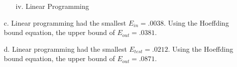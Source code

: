 \documentclass{homework}
\begin{document}
\begin{itemize}
\begin{itemize}
        \item[iv.] Linear Programming
        \begin{figure}[H]
            \centering
            \qquad
        \end{figure}
    \end{itemize}
    
    \item[c.] Linear programming had the smallest \(E_{in} = .0038\). Using the Hoeffding bound equation, the upper bound of \(E_{out} = .0381\). 
    
    \item[d.]Linear programming had the smallest \(E_{test} = .0212\). Using the Hoeffding bound equation, the upper bound of \(E_{out} = .0871\).
    

\end{itemize}
\end{document}
